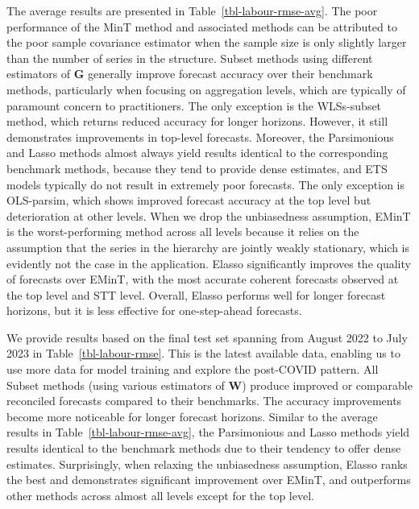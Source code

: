 \documentclass[
  11pt]{article}
\theoremstyle{plain}
\theoremstyle{remark}
\begin{document}
The average results are presented in Table~\ref{tbl-labour-rmse-avg}.
The poor performance of the MinT method and associated methods can be
attributed to the poor sample covariance estimator when the sample size
is only slightly larger than the number of series in the structure.
Subset methods using different estimators of \(\bm{G}\) generally
improve forecast accuracy over their benchmark methods, particularly
when focusing on aggregation levels, which are typically of paramount
concern to practitioners. The only exception is the WLSs-subset method,
which returns reduced accuracy for longer horizons. However, it still
demonstrates improvements in top-level forecasts. Moreover, the
Parsimonious and Lasso methods almost always yield results identical to
the corresponding benchmark methods, because they tend to provide dense
estimates, and ETS models typically do not result in extremely poor
forecasts. The only exception is OLS-parsim, which shows improved
forecast accuracy at the top level but deterioration at other levels.
When we drop the unbiasedness assumption, EMinT is the worst-performing
method across all levels because it relies on the assumption that the
series in the hierarchy are jointly weakly stationary, which is
evidently not the case in the application. Elasso significantly improves
the quality of forecasts over EMinT, with the most accurate coherent
forecasts observed at the top level and STT level. Overall, Elasso
performs well for longer forecast horizons, but it is less effective for
one-step-ahead forecasts.

We provide results based on the final test set spanning from August 2022
to July 2023 in Table~\ref{tbl-labour-rmse}. This is the latest
available data, enabling us to use more data for model training and
explore the post-COVID pattern. All Subset methods (using various
estimators of \(\bm{W}\)) produce improved or comparable reconciled
forecasts compared to their benchmarks. The accuracy improvements become
more noticeable for longer forecast horizons. Similar to the average
results in Table~\ref{tbl-labour-rmse-avg}, the Parsimonious and Lasso
methods yield results identical to the benchmark methods due to their
tendency to offer dense estimates. Surprisingly, when relaxing the
unbiasedness assumption, Elasso ranks the best and demonstrates
significant improvement over EMinT, and outperforms other methods across
almost all levels except for the top level.
\end{document}
